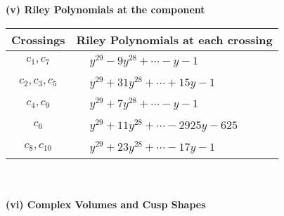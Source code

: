 \documentclass[1p]{elsarticle_modified}
\theoremstyle{definition}
\begin{document}
\newpage\renewcommand{\arraystretch}{1}
\flushleft \textbf{(v) Riley Polynomials at the component}\newline \\
\begin{tabular}{m{50pt}|m{274pt}}
Crossings & \hspace{64pt}Riley Polynomials at each crossing \\
\hline $$\begin{aligned}c_{1},c_{7}\end{aligned}$$&$\begin{aligned}
&y^{29}-9 y^{28}+\cdots- y-1
\end{aligned}$\\
\hline $$\begin{aligned}c_{2},c_{3},c_{5}\end{aligned}$$&$\begin{aligned}
&y^{29}+31 y^{28}+\cdots+15 y-1
\end{aligned}$\\
\hline $$\begin{aligned}c_{4},c_{9}\end{aligned}$$&$\begin{aligned}
&y^{29}+7 y^{28}+\cdots- y-1
\end{aligned}$\\
\hline $$\begin{aligned}c_{6}\end{aligned}$$&$\begin{aligned}
&y^{29}+11 y^{28}+\cdots-2925 y-625
\end{aligned}$\\
\hline $$\begin{aligned}c_{8},c_{10}\end{aligned}$$&$\begin{aligned}
&y^{29}+23 y^{28}+\cdots-17 y-1
\end{aligned}$\\
\hline
\end{tabular}\\~\\
\newpage\flushleft \textbf{(vi) Complex Volumes and Cusp Shapes}
\end{document}
